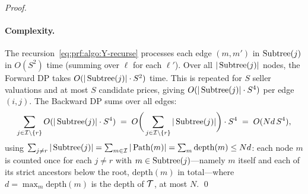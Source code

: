 \begin{proof}
\paragraph{Complexity.}
The recursion~\eqref{eq:prf:algo:Y-recurse} processes each edge $(m, m')$ in $\operatorname{Subtree}(j)$ in $O(S^2)$ time (summing over $\ell$ for each $\ell'$). Over all $|\operatorname{Subtree}(j)|$ nodes, the Forward DP takes $O(|\operatorname{Subtree}(j)| \cdot S^2)$ time. This is repeated for $S$ seller valuations and at most $S$ candidate prices, giving $O(|\operatorname{Subtree}(j)| \cdot S^4)$ per edge $(i,j)$. The Backward DP sums over all edges:
\[
\sum_{j \in \mathcal{I} \setminus \{r\}} O(|\operatorname{Subtree}(j)| \cdot S^4) \;=\; O\bigg(\sum_{j \in \mathcal{I} \setminus \{r\}} |\operatorname{Subtree}(j)|\bigg) \cdot S^4 \;=\; O(N d\, S^4),
\]
using $\sum_{j \neq r} |\operatorname{Subtree}(j)| = \sum_{m \in \mathcal{I}} |\operatorname{Path}(m)| = \sum_{m} \mathrm{depth}(m) \le N d$: each node $m$ is counted once for each $j \neq r$ with $m \in \operatorname{Subtree}(j)$---namely $m$ itself and each of its strict ancestors below the root, $\mathrm{depth}(m)$ in total---where $d = \max_m \mathrm{depth}(m)$ is the depth of $\mathcal{T}$, at most $N$.
\qed
\end{proof}
